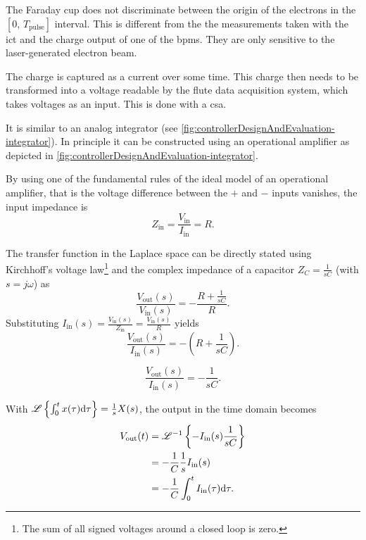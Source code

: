 The Faraday cup does not discriminate between the origin of the electrons in the $[0,\,T_\text{pulse}]$ interval. This is different from the the measurements taken with the \gls{ict} and the charge output of one of the \glspl{bpm}. They are only sensitive to the laser-generated electron beam. \cite{Nasse2019}

The charge is captured as a current over some time. This charge then needs to be transformed into a voltage readable by the \gls{flute} data acquisition system, which takes voltages as an input. This is done with a \gls{csa}.

It is similar to an analog integrator (see \autoref{fig:controllerDesignAndEvaluation-integrator}). In principle it can be constructed using an operational amplifier as depicted in \autoref{fig:controllerDesignAndEvaluation-integrator}.\cite[p.~230]{Horowitz2015}

By using one of the fundamental rules of the ideal model of an operational amplifier, that is the voltage difference between the $+$ and $-$ inputs vanishes, the input impedance is
\begin{equation}
Z_\text{in} = \frac{V_\text{in}}{I_\text{in}} = R.
\end{equation}

The transfer function in the Laplace space can be directly stated using Kirchhoff's voltage law\footnote{The sum of all signed voltages around a closed loop is zero.} and the complex impedance of a capacitor $Z_C=\frac{1}{sC}$ (with $s=j\omega$) as
\begin{equation}
\frac{V_\text{out}(s)}{V_\text{in}(s)} = -\frac{R+\frac{1}{sC}}{R}.
\end{equation}
Substituting $I_\text{in}(s)=\frac{V_\text{in}(s)}{Z_\text{in}} = \frac{V_\text{in}(s)}{R}$ yields
\begin{equation}
\frac{V_\text{out}(s)}{I_\text{in}(s)} = -\left(R+\frac{1}{sC}\right).
\end{equation}

\begin{equation}
\frac{V_\text{out}(s)}{I_\text{in}(s)} = -\frac{1}{sC}.
\end{equation}

With $\mathscr{L}\left\{\int_{0}^{t} x(\tau) \text{d}{\tau}\right\}=\frac{1}{s} X(s)$, the output in the time domain becomes
\begin{align}
V_\text{out}(t) &= \mathscr{L}^{-1}\left\{-I_\text{in}(s) \frac{1}{sC}\right\}\\
                &= -\frac{1}{C} \frac{1}{s} I_\text{in}(s)\\
                &= -\frac{1}{C} \int_{0}^{t} I_\text{in}(\tau) \text{d}{\tau}.
\end{align}

